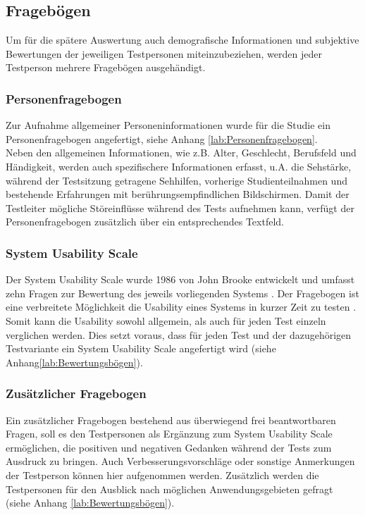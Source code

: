 \documentclass[12pt,numbers=noenddot,parskip,bibliography=totocnumbered,listof=totocnumbered]{scrreprt}
\begin{document}
\subsection{Fragebögen}
Um für die spätere Auswertung auch demografische Informationen und subjektive Bewertungen der jeweiligen Testpersonen miteinzubeziehen, werden jeder Testperson mehrere Fragebögen ausgehändigt.

\subsubsection{Personenfragebogen}
Zur Aufnahme allgemeiner Personeninformationen wurde für die Studie ein Personenfragebogen angefertigt, siehe Anhang \ref{lab:Personenfragebogen}.\\
Neben den allgemeinen Informationen, wie z.B. Alter, Geschlecht, Berufsfeld und Händigkeit, werden auch spezifischere Informationen erfasst, u.A. die Sehstärke, während der Testsitzung getragene Sehhilfen, vorherige Studienteilnahmen und bestehende Erfahrungen mit berührungsempfindlichen Bildschirmen.
Damit der Testleiter mögliche Störeinflüsse während des Tests aufnehmen kann, verfügt der Personenfragebogen zusätzlich über ein entsprechendes Textfeld.

\subsubsection{System Usability Scale}
Der System Usability Scale wurde 1986 von John Brooke entwickelt und umfasst zehn Fragen zur Bewertung des jeweils vorliegenden Systems \citep{sus}. Der Fragebogen ist eine verbreitete Möglichkeit die Usability eines Systems in kurzer Zeit zu testen \citep{sus2013}. Somit kann die Usability sowohl allgemein, als auch für jeden Test einzeln verglichen werden. Dies setzt voraus, dass für jeden Test und der dazugehörigen Testvariante ein System Usability Scale angefertigt wird (siehe Anhang\ref{lab:Bewertungsbögen}).

\subsubsection{Zusätzlicher Fragebogen}
Ein zusätzlicher Fragebogen bestehend aus überwiegend frei beantwortbaren Fragen, soll es den Testpersonen als Ergänzung zum System Usability Scale ermöglichen, die positiven und negativen Gedanken während der Tests zum Ausdruck zu bringen. Auch Verbesserungsvorschläge oder sonstige Anmerkungen der Testperson können hier aufgenommen werden. Zusätzlich werden die Testpersonen für den Ausblick nach möglichen Anwendungsgebieten gefragt (siehe Anhang \ref{lab:Bewertungsbögen}).
\end{document}
